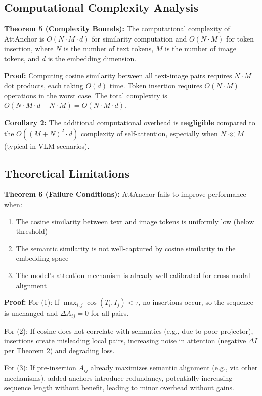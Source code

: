 \documentclass[11pt]{article}
\begin{document}
\subsection{Computational Complexity Analysis}

\textbf{Theorem 5 (Complexity Bounds):} The computational complexity of AttAnchor is $O(N \cdot M \cdot d)$ for similarity computation and $O(N \cdot M)$ for token insertion, where $N$ is the number of text tokens, $M$ is the number of image tokens, and $d$ is the embedding dimension.

\textbf{Proof:} Computing cosine similarity between all text-image pairs requires $N \cdot M$ dot products, each taking $O(d)$ time. Token insertion requires $O(N \cdot M)$ operations in the worst case. The total complexity is $O(N \cdot M \cdot d + N \cdot M) = O(N \cdot M \cdot d)$.

\textbf{Corollary 2:} The additional computational overhead is \textbf{negligible} compared to the $O((M + N)^2 \cdot d)$ complexity of self-attention, especially when $N \ll M$ (typical in VLM scenarios).

\subsection{Theoretical Limitations}

\textbf{Theorem 6 (Failure Conditions):} AttAnchor fails to improve performance when:

\begin{enumerate}
\item The cosine similarity between text and image tokens is uniformly low (below threshold)
\item The semantic similarity is not well-captured by cosine similarity in the embedding space
\item The model’s attention mechanism is already well-calibrated for cross-modal alignment
\end{enumerate}

\textbf{Proof:} For (1): If $\max_{i,j} \cos(T_i, I_j) < \tau$, no insertions occur, so the sequence is unchanged and $\Delta A_{ij} = 0$ for all pairs.

For (2): If cosine does not correlate with semantics (e.g., due to poor projector), insertions create misleading local pairs, increasing noise in attention (negative $\Delta I$ per Theorem 2) and degrading loss.

For (3): If pre-insertion $A_{ij}$ already maximizes semantic alignment (e.g., via other mechanisms), added anchors introduce redundancy, potentially increasing sequence length without benefit, leading to minor overhead without gains.
\end{document}
